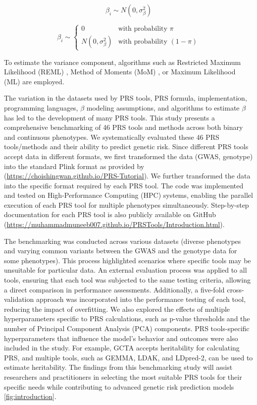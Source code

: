 \documentclass[pdflatex,sn-nature]{sn-jnl}%
\begin{document}
\begin{equation}
\beta_i \sim N(0, \sigma_\beta^2)
\label{llmequation}
\end{equation}

\begin{equation}
\beta_i \sim \begin{cases} 
0 & \text{with probability } \pi \\
N(0, \sigma_\beta^2) & \text{with probability } (1 - \pi)
\end{cases}
\label{bayesequation}
\end{equation}

To estimate the variance component, algorithms such as Restricted Maximum Likelihood (REML) \cite{Corbeil1976}, Method of Moments (MoM) \cite{Lindsay2005}, or Maximum Likelihood (ML) \cite{MARDIA1984} are employed.



The variation in the datasets used by PRS tools, PRS formula, implementation, programming languages, \(\beta\) modeling assumptions, and algorithms to estimate \(\beta\) has led to the development of many PRS tools. This study presents a comprehensive benchmarking of 46 PRS tools and methods across both binary and continuous phenotypes. We systematically evaluated these 46 PRS tools/methods and their ability to predict genetic risk. Since different PRS tools accept data in different formats, we first transformed the data (GWAS, genotype) into the standard Plink format as provided by \cite{Choi2020} (\url{https://choishingwan.github.io/PRS-Tutorial}). We further transformed the data into the specific format required by each PRS tool. The code was implemented and tested on High-Performance Computing (HPC) systems, enabling the parallel execution of each PRS tool for multiple phenotypes simultaneously. Step-by-step documentation for each PRS tool is also publicly available on GitHub (\url{https://muhammadmuneeb007.github.io/PRSTools/Introduction.html}).

The benchmarking was conducted across various datasets (diverse phenotypes and varying common variants between the GWAS and the genotype data for some phenotypes). This process highlighted scenarios where specific tools may be unsuitable for particular data. An external evaluation process was applied to all tools, ensuring that each tool was subjected to the same testing criteria, allowing a direct comparison in performance assessments. Additionally, a five-fold cross-validation approach was incorporated into the performance testing of each tool, reducing the impact of overfitting. We also explored the effects of multiple hyperparameters specific to PRS calculations, such as p-value thresholds and the number of Principal Component Analysis (PCA) components. PRS tools-specific hyperparameters that influence the model's behavior and outcomes were also included in the study. For example, GCTA accepts heritability for calculating PRS, and multiple tools, such as GEMMA, LDAK, and LDpred-2, can be used to estimate heritability. The findings from this benchmarking study will assist researchers and practitioners in selecting the most suitable PRS tools for their specific needs while contributing to advanced genetic risk prediction models \ref{fig:introduction}.
\end{document}
